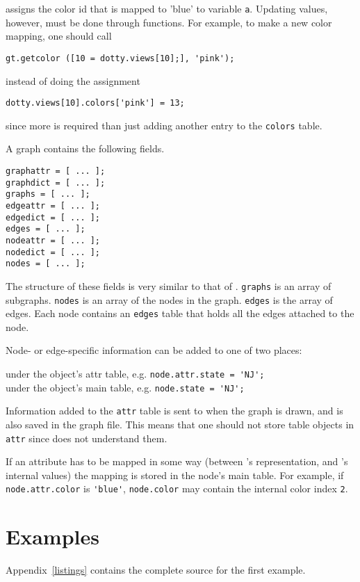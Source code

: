 \noindent
assigns the color id that is mapped to 'blue' to variable \verb'a'.  Updating
values, however, must be done through functions.  For example, to make a new
color mapping, one should call

\begin{verbatim}
gt.getcolor ([10 = dotty.views[10];], 'pink');
\end{verbatim}

\noindent
instead of doing the assignment

\begin{verbatim}
dotty.views[10].colors['pink'] = 13;
\end{verbatim}

\noindent
since more is required than just adding another entry to the \verb'colors'
table.

A graph contains the following fields.

\begin{verbatim}
graphattr = [ ... ];
graphdict = [ ... ];
graphs = [ ... ];
edgeattr = [ ... ];
edgedict = [ ... ];
edges = [ ... ];
nodeattr = [ ... ];
nodedict = [ ... ];
nodes = [ ... ];
\end{verbatim}

\noindent
The structure of these fields is very similar to that of {\DOT}. \verb"graphs"
is an array of subgraphs. \verb"nodes" is an array of the nodes in the graph.
\verb"edges" is the array of edges. Each node contains an \verb"edges" table
that holds all the edges attached to the node.

Node- or edge-specific information can be added to one of two places:

\begin{obeylines}
	under the object's attr table, e.g. \verb"node.attr.state = 'NJ';"
	under the object's main table, e.g. \verb"node.state = 'NJ';"
\end{obeylines}

\noindent
Information added to the \verb"attr" table is sent to {\DOT} when the graph is
drawn, and is also saved in the graph file.  This means that one should not
store table objects in \verb"attr" since {\DOT} does not understand them.

If an attribute has to be mapped in some way (between {\DOT}'s representation,
and {\DOTTY}'s internal values) the mapping is stored in the node's main table.
For example, if \verb"node.attr.color" is \verb"'blue'", \verb"node.color" may
contain the internal color index \verb"2".

\section{Examples}
Appendix~\ref{listings} contains the complete source for the first
example.


